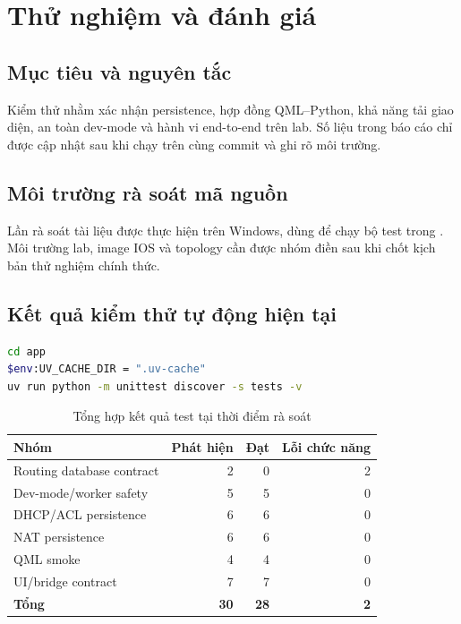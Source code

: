 \chapter{Thử nghiệm và đánh giá}
\label{chap:thu-nghiem-danh-gia}

\section{Mục tiêu và nguyên tắc}

Kiểm thử nhằm xác nhận persistence, hợp đồng QML--Python, khả năng tải giao diện, an toàn dev-mode và hành vi end-to-end trên lab. Số liệu trong báo cáo chỉ được cập nhật sau khi chạy trên cùng commit và ghi rõ môi trường.

\section{Môi trường rà soát mã nguồn}

Lần rà soát tài liệu được thực hiện trên Windows, dùng  để chạy bộ test trong . Môi trường lab, image IOS và topology cần được nhóm điền sau khi chốt kịch bản thử nghiệm chính thức.

\section{Kết quả kiểm thử tự động hiện tại}

\begin{lstlisting}[language=bash,caption={Lệnh chạy bộ kiểm thử}]
cd app
$env:UV_CACHE_DIR = ".uv-cache"
uv run python -m unittest discover -s tests -v
\end{lstlisting}

\begin{table}[H]
\centering
\caption{Tổng hợp kết quả test tại thời điểm rà soát}
\label{tab:test-summary}
\begin{tabularx}{\textwidth}{X r r r}
\toprule
Nhóm & Phát hiện & Đạt & Lỗi chức năng \\
\midrule
Routing database contract & 2 & 0 & 2 \\
Dev-mode/worker safety & 5 & 5 & 0 \\
DHCP/ACL persistence & 6 & 6 & 0 \\
NAT persistence & 6 & 6 & 0 \\
QML smoke & 4 & 4 & 0 \\
UI/bridge contract & 7 & 7 & 0 \\
\midrule
\textbf{Tổng} & \textbf{30} & \textbf{28} & \textbf{2} \\
\bottomrule
\end{tabularx}
\end{table}

